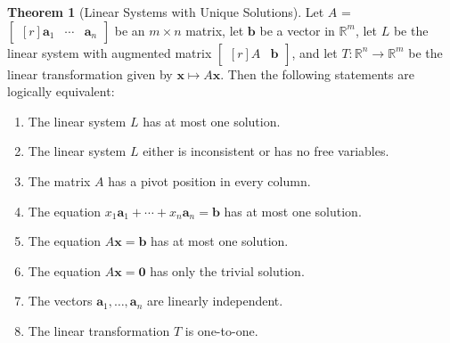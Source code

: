\documentclass{myart}
\renewcommand{\vec}[1]{\ensuremath{\mathbf{#1}}}
\newcommand{\mat}[1]{\ensuremath{#1}}
\newcommand{\R}[1][]{\ensuremath{\mathbb{R}^{#1}}}
\newcommand{\by}{\ensuremath{\times}}
\newcommand{\MAT}[2][r]{\ensuremath{\begin{bmatrix*}[#1]#2\end{bmatrix*}}}
\newcommand{\many}[2][n]{\ensuremath{{#2}_1, \ldots, {#2}_{#1}}}
\theoremstyle{definition}
\newtheorem{thm}{Theorem}
\begin{document}
\begin{thm}[Linear Systems with Unique Solutions]
  Let \mat A = \MAT{\vec a_1 & \cdots & \vec a_n} be an $m \by n$
  matrix, let \vec b be a vector in \R[m], let $L$ be the linear
  system with augmented matrix \MAT{\mat A & \vec b}, and let $T :
  \R[n] \to \R[m]$ be the linear transformation given by $\vec x
  \mapsto \mat A\vec x$. Then the following statements are logically
  equivalent:
  \begin{enumerate}
  \item The linear system $L$ has at most one solution.
  \item The linear system $L$ either is inconsistent or has no free
    variables.
  \item The matrix \mat A has a pivot position in every column.
  \item The equation $x_1\vec a_1 + \cdots + x_n\vec a_n = \vec b$ has
    at most one solution.
  \item The equation $\mat A\vec x = \vec b$ has at most one solution.
  \item The equation $\mat A\vec x = \vec 0$ has only the trivial
    solution.
  \item The vectors \many{\vec a} are linearly independent.
  \item The linear transformation $T$ is one-to-one.
  \end{enumerate}
\end{thm}
\end{document}
